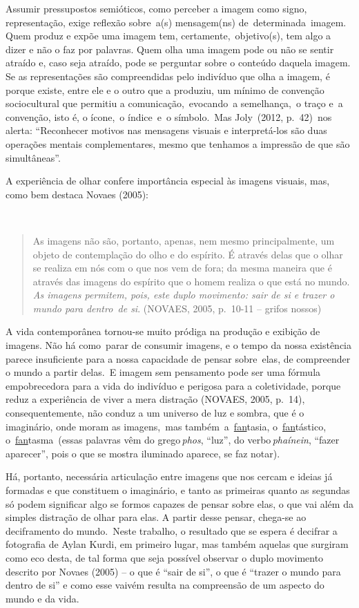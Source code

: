 \documentclass[
  letterpaper,
]{scrbook}
\begin{document}
Assumir pressupostos semióticos, como perceber a imagem como signo,
representação, exige reflexão sobre~a(s) mensagem(ns)
de~determinada~imagem. Quem produz e expõe uma imagem tem,
certamente,~objetivo(s), tem algo a dizer e não o faz por palavras. Quem
olha uma imagem pode ou não se sentir atraído e, caso seja atraído, pode
se perguntar sobre o conteúdo daquela imagem. Se as representações são
compreendidas pelo indivíduo que olha a imagem, é porque existe, entre
ele e o outro que a produziu, um mínimo de convenção sociocultural que
permitiu a comunicação,~evocando~a semelhança,~o traço e~a convenção,
isto é, o ícone,~o índice~e~o símbolo.~Mas Joly~(2012, p.~42)~nos
alerta: ``Reconhecer motivos nas mensagens visuais e interpretá-los são
duas operações mentais complementares, mesmo que tenhamos a impressão de
que são simultâneas''.~

A experiência de olhar confere importância especial às imagens visuais,
mas, como bem destaca Novaes (2005):~

~

\begin{quote}
As imagens não são, portanto, apenas, nem mesmo principalmente, um
objeto de contemplação do olho e do espírito. É através delas que o
olhar se realiza em nós com o que nos vem de fora; da mesma maneira que
é através das imagens do espírito que o homem realiza o que está no
mundo. \emph{As imagens permitem, pois, este duplo movimento: sair de si
e trazer o mundo para dentro~de si}. (NOVAES, 2005, p.~10-11 -- grifos
nossos)~ ~
\end{quote}

A vida contemporânea tornou-se muito pródiga na produção e exibição de
imagens. Não há como~parar de consumir imagens, e o tempo da nossa
existência parece insuficiente para a nossa capacidade de pensar
sobre~elas, de compreender o mundo a partir delas.~E imagem sem
pensamento pode ser uma fórmula empobrecedora para a vida do indivíduo e
perigosa para a coletividade, porque reduz a experiência de viver a mera
distração (NOVAES, 2005, p.~14), consequentemente, não conduz a um
universo de luz e sombra, que é o imaginário, onde moram as imagens,~mas
também~a~\uline{fan}tasia, o~\uline{fan}tástico,
o~\uline{fan}tasma~(essas palavras vêm do grego\,\emph{phos}, ``luz'',
do verbo\,\emph{phaínein}, ``fazer aparecer'', pois o que se mostra
iluminado aparece, se faz notar).~

Há, portanto, necessária articulação entre imagens que nos cercam e
ideias já formadas e que constituem o imaginário, e tanto as primeiras
quanto as segundas só podem significar algo se formos capazes de pensar
sobre elas, o que vai além da simples distração de olhar para elas. A
partir desse pensar, chega-se ao deciframento do mundo.~Neste trabalho,
o resultado que se espera é decifrar a fotografia de Aylan Kurdi, em
primeiro lugar, mas também aquelas que surgiram como eco desta, de tal
forma que seja possível observar o duplo movimento descrito por Novaes
(2005) -- o que é ``sair de si'', o que é ``trazer o mundo para dentro
de si'' e como esse vaivém resulta na compreensão de um aspecto do mundo
e da vida.
\end{document}
